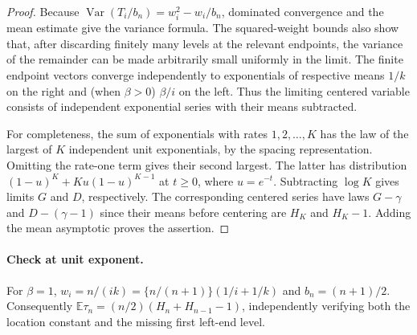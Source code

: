 \documentclass[11pt]{article}
\begin{document}
\begin{proof}
Because $\operatorname{Var}(T_i/b_n)=w_i^2-w_i/b_n$, dominated convergence and the mean estimate give the variance formula. The squared-weight bounds also show that, after discarding finitely many levels at the relevant endpoints, the variance of the remainder can be made arbitrarily small uniformly in the limit. The finite endpoint vectors converge independently to exponentials of respective means $1/k$ on the right and (when $\beta>0$) $\beta/i$ on the left. Thus the limiting centered variable consists of independent exponential series with their means subtracted.

For completeness, the sum of exponentials with rates $1,2,\ldots,K$ has the law of the largest of $K$ independent unit exponentials, by the spacing representation. Omitting the rate-one term gives their second largest. The latter has distribution $(1-u)^K+Ku(1-u)^{K-1}$ at $t\ge0$, where $u=e^{-t}$. Subtracting $\log K$ gives limits $G$ and $D$, respectively. The corresponding centered series have laws $G-\gamma$ and $D-(\gamma-1)$ since their means before centering are $H_K$ and $H_K-1$. Adding the mean asymptotic proves the assertion.
\end{proof}
\paragraph{Check at unit exponent.}
For $\beta=1$, $w_i=n/(ik)=\{n/(n+1)\}(1/i+1/k)$ and $b_n=(n+1)/2$. Consequently $\mathbb E\tau_n=(n/2)(H_n+H_{n-1}-1)$, independently verifying both the location constant and the missing first left-end level.
\end{document}
